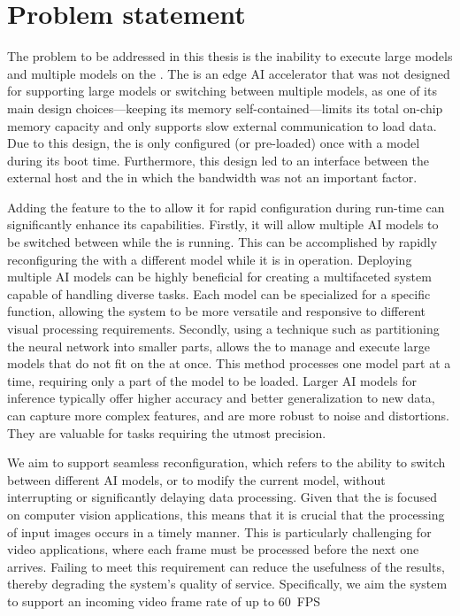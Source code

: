 \section{Problem statement}
The problem to be addressed in this thesis is the inability to execute large models and multiple models on the \graicore{}.
The \graicore{} is an edge AI accelerator that was not designed for supporting large models or switching between multiple models, as one of its main design choices---keeping its memory self-contained---limits its total on-chip memory capacity and only supports slow external communication to load data.
Due to this design, the \graicore{} is only configured (or pre-loaded) once with a model during its boot time.
Furthermore, this design led to an interface between the external host and the \graicore{} in which the bandwidth was not an important factor.

Adding the feature to the \graicore{} to allow it for rapid configuration during run-time can significantly enhance its capabilities.
Firstly, it will allow multiple AI models to be switched between while the \graicore{} is running.
This can be accomplished by rapidly reconfiguring the \graicore{} with a different model while it is in operation.
Deploying multiple AI models can be highly beneficial for creating a multifaceted system capable of handling diverse tasks.
Each model can be specialized for a specific function, allowing the system to be more versatile and responsive to different visual processing requirements.
Secondly, using a technique such as partitioning the neural network into smaller parts, allows the \graicore{} to manage and execute large models that do not fit on the \graicore{} at once.
This method processes one model part at a time, requiring only a part of the model to be loaded.
Larger AI models for inference typically offer higher accuracy and better generalization to new data, can capture more complex features, and are more robust to noise and distortions.
They are valuable for tasks requiring the utmost precision.

We aim to support seamless reconfiguration, which refers to the ability to switch between different AI models, or to modify the current model, without interrupting or significantly delaying data processing.
Given that the \graicore{} is focused on computer vision applications, this means that it is crucial that the processing of input images occurs in a timely manner.
This is particularly challenging for video applications, where each frame must be processed before the next one arrives.
Failing to meet this requirement can reduce the usefulness of the results, thereby degrading the system's quality of service.
Specifically, we aim the system to support an incoming video frame rate of up to \SI{60}{FPS}

